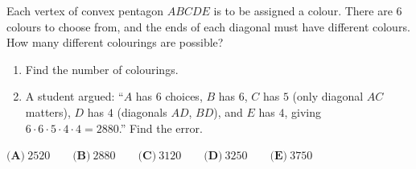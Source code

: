 Each vertex of convex pentagon $ABCDE$ is to be assigned a colour. There are $6$ colours to choose from, and the ends of each diagonal must have different colours. How many different colourings are possible?

\begin{enumerate}
\item[(a)] Find the number of colourings.
\item[(b)] A student argued: ``$A$ has $6$ choices, $B$ has $6$, $C$ has $5$ (only diagonal $AC$ matters), $D$ has $4$ (diagonals $AD$, $BD$), and $E$ has $4$, giving $6\cdot6\cdot5\cdot4\cdot4=2880$.'' Find the error.
\end{enumerate}
$\textbf{(A)}\ 2520\qquad\textbf{(B)}\ 2880\qquad\textbf{(C)}\ 3120\qquad\textbf{(D)}\ 3250\qquad\textbf{(E)}\ 3750$
